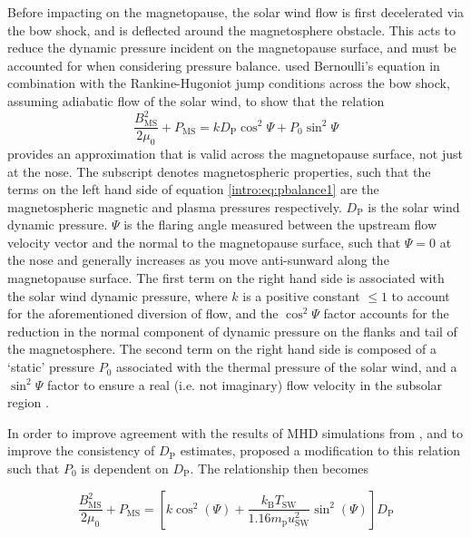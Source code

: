 {Before impacting on the magnetopause, the solar wind flow is first decelerated via the bow shock, and is deflected around the magnetosphere obstacle. This acts to reduce the dynamic pressure incident on the magnetopause surface, and must be accounted for when considering pressure balance. \citet{petrinec1997} used Bernoulli's equation in combination with the Rankine-Hugoniot jump conditions across the bow shock, assuming adiabatic flow of the solar wind, to show that the relation
\begin{equation}\label{intro:eq:pbalance1}
\frac{B_{\mathrm{MS}}^2}{2\mu_0} + P_{\mathrm{MS}} = kD_\mathrm{P}\cos^2\Psi + P_0\sin^2\Psi
\end{equation}
provides an approximation that is valid across the magnetopause surface, not just at the nose. The subscript {} denotes magnetospheric properties, such that the terms on the left hand side of equation \ref{intro:eq:pbalance1} are the magnetospheric magnetic and plasma pressures respectively. $D_\mathrm{P}$ is the solar wind dynamic pressure.  $\Psi$ is the flaring angle measured between the upstream flow velocity vector and the normal to the magnetopause surface, such that $\Psi=0$ at the nose and generally increases as you move anti-sunward along the magnetopause surface. The first term on the right hand side is associated with the solar wind dynamic pressure, where $k$ is a positive constant $\leq1$ to account for the aforementioned diversion of flow, and the $\cos^2\Psi$ factor accounts for the reduction in the normal component of dynamic pressure on the flanks and tail of the magnetosphere. The second term on the right hand side is composed of a `static' pressure $P_0$ associated with the thermal pressure of the solar wind, and a $\sin^2\Psi$ factor to ensure a real (i.e. not imaginary) flow velocity in the subsolar region \citet[see][]{petrinec1997}.

In order to improve agreement with the results of MHD simulations from \citet{hansen2005}, and to improve the consistency of $D_\mathrm{P}$ estimates, \citet{kanani2010} proposed a modification to this relation such that $P_0$ is dependent on $D_\mathrm{P}$. The relationship then becomes

\begin{equation}\label{intro:eq:pbalance2}
\frac{B_\mathrm{MS}^2}{2\mu_0} + P_\mathrm{MS} = [k\cos^2(\Psi) + \frac{k_\mathrm{B}T_\mathrm{SW}}{1.16m_\mathrm{p}u_\mathrm{SW}^2}\sin^2(\Psi)] D_\mathrm{P}
\end{equation}

}
